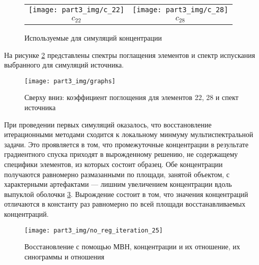 
\begin{figure}
  \centering
\begin{tabular}{@{}c@{}c}
    \texttt{[image: part3\_img/c\_22]}
  &
    \texttt{[image: part3\_img/c\_28]}
  \\
    $c_22$ & $c_28$
\end{tabular}
  \caption{Используемые для симуляций концентрации}
\label{fig:white_phantom}
\end{figure}


На рисунке \ref{fig:source} представлены спектры поглащения элементов и спектр испускания выбранного для симуляций источника.

\begin{figure}
  \centering
  \texttt{[image: part3\_img/graphs]}
  \caption{Сверху вниз: коэффициент поглощения для элементов 22, 28 и спект источника}
  \label{fig:source}
\end{figure}

При проведении первых симуляций оказалось, что восстановление итерационными методами сходится к локальному минмуму мультиспектральной задачи.
Это проявляется в том, что промежуточные концентрации в результате градиентного спуска приходят в вырожденному решению, не содержащему специфики элементов, из которых состоит образец.
Обе концентрации получаются равномерно размазанными по площади, занятой объектом, с характерными артефактами --- лишним увеличением концентрации вдоль выпуклой оболочки \ref{fig:wrart_noreg_25}.
Вырождение состоит в том, что значения концентраций отличаются в константу раз равномерно по всей площади восстанавливаемых концентраций.

\begin{figure}
  \centering
  \texttt{[image: part3\_img/no\_reg\_iteration\_25]}
  \caption{Восстановление с помощью МВН, концентрации и их отношение, их синограммы и отношения}
  \label{fig:wrart_noreg_25}
\end{figure}

